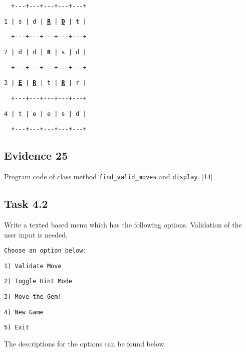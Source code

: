\begin{itemize}
\begin{minipage}[t]{1\columnwidth}
\texttt{~~+-{}-{}-+-{}-{}-+-{}-{}-+-{}-{}-+-{}-{}-+}

\texttt{1 | s | d | }\texttt{\textbf{\uline{R}}}\texttt{ | }\texttt{\textbf{\uline{D}}}\texttt{
| t |}

\texttt{~~+-{}-{}-+-{}-{}-+-{}-{}-+-{}-{}-+-{}-{}-+}

\texttt{2 | d | d | }\texttt{\textbf{\uline{R}}}\texttt{ | s |
d |}

\texttt{~~+-{}-{}-+-{}-{}-+-{}-{}-+-{}-{}-+-{}-{}-+}

\texttt{3 | }\texttt{\textbf{\uline{E}}}\texttt{ | }\texttt{\textbf{\uline{R}}}\texttt{
| t | }\texttt{\textbf{\uline{R}}}\texttt{ | r |}

\texttt{~~+-{}-{}-+-{}-{}-+-{}-{}-+-{}-{}-+-{}-{}-+}

\texttt{4 | t | e | e | s | d |}

\texttt{~~+-{}-{}-+-{}-{}-+-{}-{}-+-{}-{}-+-{}-{}-+}%
\end{minipage}
\end{itemize}

\subsection*{Evidence 25 }

Program code of class method \texttt{find\_valid\_moves} and \texttt{display}.
\hfill{}{[}14{]}

\subsection*{Task 4.2 }

Write a texted based menu which has the following options. Validation
of the user input is needed. 

\noindent %
\noindent\begin{minipage}[t]{1\columnwidth}%
\texttt{Choose an option below: }

\texttt{1) Validate Move }

\texttt{2) Toggle Hint Mode}

\texttt{3) Move the Gem!}

\texttt{4) New Game}

\texttt{5) Exit }%
\end{minipage}

The descriptions for the options can be found below. 

